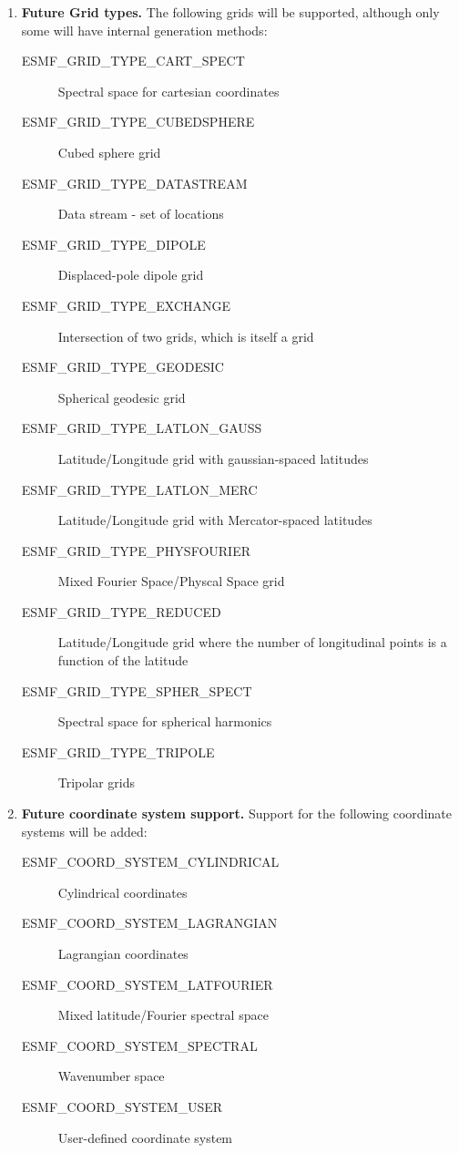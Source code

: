 \begin{enumerate}
\item {\bf Future Grid types.}  The following grids will
be supported, although only some will have internal generation 
methods:
 \begin{description}
    \item [ESMF\_GRID\_TYPE\_CART\_SPECT]
          Spectral space for cartesian coordinates
    \item [ESMF\_GRID\_TYPE\_CUBEDSPHERE]
          Cubed sphere grid
    \item [ESMF\_GRID\_TYPE\_DATASTREAM]
          Data stream - set of locations
    \item [ESMF\_GRID\_TYPE\_DIPOLE]
          Displaced-pole dipole grid
    \item [ESMF\_GRID\_TYPE\_EXCHANGE]
          Intersection of two grids, which is itself a grid
    \item [ESMF\_GRID\_TYPE\_GEODESIC]
          Spherical geodesic grid
    \item [ESMF\_GRID\_TYPE\_LATLON\_GAUSS]
          Latitude/Longitude grid with gaussian-spaced latitudes
    \item [ESMF\_GRID\_TYPE\_LATLON\_MERC]
          Latitude/Longitude grid with Mercator-spaced latitudes
    \item [ESMF\_GRID\_TYPE\_PHYSFOURIER]
          Mixed Fourier Space/Physcal Space grid
    \item [ESMF\_GRID\_TYPE\_REDUCED]
          Latitude/Longitude grid where the number of longitudinal points is a
          function of the latitude
    \item [ESMF\_GRID\_TYPE\_SPHER\_SPECT]
          Spectral space for spherical harmonics
    \item [ESMF\_GRID\_TYPE\_TRIPOLE]
          Tripolar grids
 \end{description}

\item {\bf Future coordinate system support.}  Support for the following
coordinate systems will be added:
 \begin{description}
    \item [ESMF\_COORD\_SYSTEM\_CYLINDRICAL]
          Cylindrical coordinates
    \item [ESMF\_COORD\_SYSTEM\_LAGRANGIAN]
          Lagrangian coordinates
    \item [ESMF\_COORD\_SYSTEM\_LATFOURIER]
          Mixed latitude/Fourier spectral space
    \item [ESMF\_COORD\_SYSTEM\_SPECTRAL]
          Wavenumber space
    \item [ESMF\_COORD\_SYSTEM\_USER]
          User-defined coordinate system
 \end{description}


\end{enumerate}
